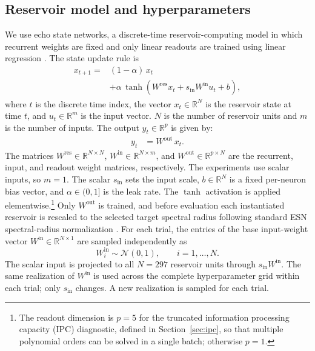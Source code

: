 \documentclass[a4paper,fleqn]{style_neural_networks/cas-dc}
\let\parencite\citep
\begin{document}
\subsection{Reservoir model and hyperparameters}
We use echo state networks, a discrete-time reservoir-computing model in which recurrent weights are fixed and only linear readouts are trained using linear regression \parencite{jaeger_echo_state_2001,Lukosevicius2012PracticalESN,sun_systematic_review_2024}. The state update rule is
\begin{align}
{x}_{t+1} = &(1-\alpha)\,x_t \nonumber \\
& +\alpha\,\tanh\!\left(W^{\mathrm{res}} x_t + s_{\mathrm{in}}W^{\mathrm{in}} u_{t} + b \right),
\end{align}
where \(t\) is the discrete time index, the vector \(x_t\in\mathbb{R}^{N}\) is the reservoir state at time \(t\), and \(u_t\in\mathbb{R}^{m}\) is the input vector. \(N\) is the number of reservoir units and $m$ is the number of inputs. 
The output \(y_t\in\mathbb{R}^{p}\) is given by:
\begin{align}
y_t &= W^{\mathrm{out}}\,x_t.
\end{align}
The matrices \(W^{\mathrm{res}}\in\mathbb{R}^{N\times N}\), \(W^{\mathrm{in}}\in\mathbb{R}^{N\times m}\), and \(W^{\mathrm{out}}\in\mathbb{R}^{p\times N}\) are the recurrent, input, and readout weight matrices, respectively.
The experiments use scalar inputs, so \(m=1\). 
The scalar \(s_{\mathrm{in}}\) sets the input scale, \(b\in\mathbb{R}^{N}\) is a fixed per-neuron bias vector, and \(\alpha\in(0,1]\) is the leak rate. The \(\tanh\) activation is applied elementwise.\footnote{The readout dimension is \(p=5\) for the truncated information processing capacity (IPC) diagnostic, defined in Section~\ref{sec:ipc}, so that multiple polynomial orders can be solved in a single batch; otherwise \(p=1\).} Only \(W^{\mathrm{out}}\) is trained, and before evaluation each instantiated reservoir is rescaled to the selected target spectral radius following standard ESN spectral-radius normalization \citep{Lukosevicius2012PracticalESN}.
For each trial, the entries of the base input-weight vector
\(W^{\mathrm{in}}\in\mathbb{R}^{N\times 1}\) are sampled independently as
\[
W^{\mathrm{in}}_{i}\sim\mathcal{N}(0,1),
\qquad i=1,\ldots,N.
\]
The scalar input is projected to all \(N=297\) reservoir units through
\(s_{\mathrm{in}}W^{\mathrm{in}}\). The same realization of
\(W^{\mathrm{in}}\) is used across the complete hyperparameter grid within
each trial; only \(s_{\mathrm{in}}\) changes. A new realization is sampled
for each trial.
\end{document}
